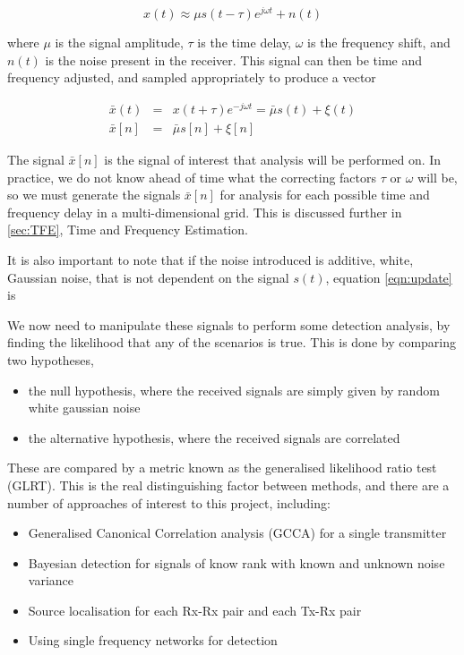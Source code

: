\documentclass[12pt,openany,a4paper]{book}
\begin{document}
\begin{equation}
\label{eqn:approx}
x(t) \approx \mu s(t-\tau) e^{j\omega t} + n(t)
\end{equation}

\bigskip

where $\mu$ is the signal amplitude, $\tau$ is the time delay, $\omega$ is the frequency shift, and $n(t)$ is the noise present in the receiver. This signal can then be time and frequency adjusted, and sampled appropriately to produce a vector

\begin{eqnarray}
\label{eqn:update}
\bar{x}(t) & = & x(t+\tau) e^{-j\omega t} = \bar{\mu} s(t) + \xi(t) \\
\bar{x}[n] & = & \bar{\mu}s[n] + \xi[n]
\end{eqnarray}

\bigskip

The signal $\bar{x}[n]$ is the signal of interest that analysis will be performed on. In practice, we do not know ahead of time what the correcting factors $\tau$ or $\omega$ will be, so we must generate the signals $\bar{x}[n]$ for analysis for each possible time and frequency delay in a multi-dimensional grid. This is discussed further in \ref{sec:TFE}, Time and Frequency Estimation.

It is also important to note that if the noise introduced is additive, white, Gaussian noise, that is not dependent on the signal $s(t)$,  equation \ref{eqn:update} is 

We now need to manipulate these signals to perform some detection analysis, by finding the likelihood that any of the scenarios is true. This is done by comparing two hypotheses,

\begin{itemize}
\item{the null hypothesis, where the received signals are simply given by random white gaussian noise}
\item{the alternative hypothesis, where the received signals are correlated}
\end{itemize}

These are compared by a metric known as the generalised likelihood ratio test (GLRT). This is the real distinguishing factor between methods, and there are a number of approaches of interest to this project, including:

\begin{itemize}
\item{Generalised Canonical Correlation analysis (GCCA) for a single transmitter \cite{gcc}}
\item{Bayesian detection for signals of know rank with known and unknown noise variance \cite{SS15}}
\item{Source localisation for each Rx-Rx pair and each Tx-Rx pair \cite{DE16}}
\item{Using single frequency networks for detection \cite{SFN}}
\end{itemize}
\end{document}
